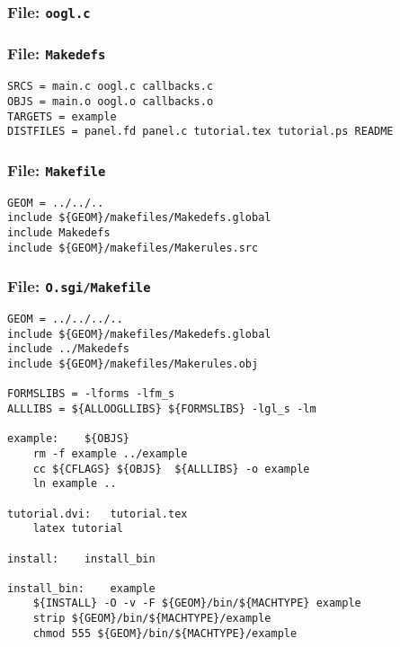 
\subsubsection{File: {\tt oogl.c}}


\subsubsection{File: {\tt Makedefs}}
\begin{verbatim}
SRCS = main.c oogl.c callbacks.c
OBJS = main.o oogl.o callbacks.o
TARGETS = example
DISTFILES = panel.fd panel.c tutorial.tex tutorial.ps README
\end{verbatim}

\subsubsection{File: {\tt Makefile}}
\begin{verbatim}
GEOM = ../../..
include ${GEOM}/makefiles/Makedefs.global
include Makedefs
include ${GEOM}/makefiles/Makerules.src
\end{verbatim}

\subsubsection{File: {\tt O.sgi/Makefile}}
\begin{verbatim}
GEOM = ../../../..
include ${GEOM}/makefiles/Makedefs.global
include ../Makedefs
include ${GEOM}/makefiles/Makerules.obj

FORMSLIBS = -lforms -lfm_s
ALLLIBS = ${ALLOOGLLIBS} ${FORMSLIBS} -lgl_s -lm

example:	${OBJS} 
	rm -f example ../example
	cc ${CFLAGS} ${OBJS}  ${ALLLIBS} -o example
	ln example ..

tutorial.dvi:	tutorial.tex
	latex tutorial

install:	install_bin

install_bin:	example
	${INSTALL} -O -v -F ${GEOM}/bin/${MACHTYPE} example
	strip ${GEOM}/bin/${MACHTYPE}/example
	chmod 555 ${GEOM}/bin/${MACHTYPE}/example
\end{verbatim}




